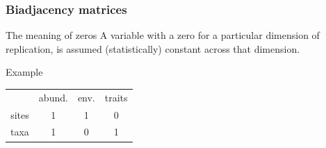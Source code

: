 \documentclass{beamer}
\numberwithin{exercise}{section}
\begin{document}
\begin{frame}
\frametitle{Biadjacency matrices}
\begin{center}
\begin{block}{The meaning of zeros}
A variable with a zero for a particular dimension of replication, is assumed (statistically) constant across that dimension.
\end{block}
\pause
\begin{block}{Example}
\begin{tabular}{cccc}
& abund. & env. & traits \\ 
sites & 1  &  1 & 0 \\
taxa & 1  &  0 & 1 \\
\end{tabular}
\end{block}
\end{center}
\end{frame}

%
\end{document}
